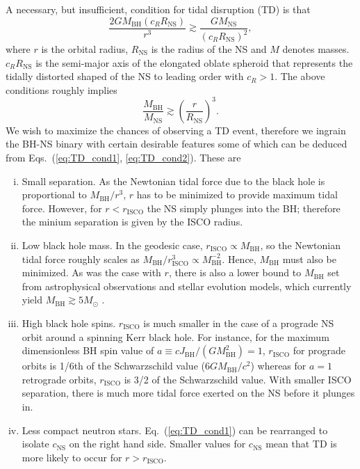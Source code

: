 \documentclass[prd,amsmath,amssymb,aps,floats,amsfonts,notitlepage,superscriptaddress,eqsecnum,nofootinbib,10pt]{revtex4-1}
\newcommand{\f}{\frac}
\newcommand{\be}{\begin{equation}}
\newcommand{\ee}{\end{equation}}
\begin{document}
A necessary, but insufficient, condition for tidal disruption (TD) is that
\be
\f{2 G M_\text{BH} (c_R R_\text{NS})}{r^3} \gtrsim \f{G M_\text{NS}}{(c_R R_\text{NS})^2} \label{eq:TD_cond1},
\ee
where $r$ is the orbital radius, $R_\text{NS}$ is the radius of the NS and $M$ denotes masses. 
$c_R R_\text{NS}$ is the semi-major axis of the elongated oblate spheroid that represents the tidally distorted shaped of the NS to leading order with
$c_R >1 $. %
The above conditions roughly implies
%
\be
\f{M_\text{BH}}{M_\text{NS}} \gtrsim \left(\f{r}{R_\text{NS}}\right)^3 \label{eq:TD_cond2}.
\ee
%
We wish to maximize the chances of observing a TD event, therefore we ingrain the BH-NS binary with certain desirable features
some of which can be deduced from Eqs.~(\ref{eq:TD_cond1}, \ref{eq:TD_cond2}). These are
%
%
\begin{enumerate}[(i)]
 \item Small separation. As the Newtonian tidal force due to the black hole is proportional to $M_\text{BH}/r^3$, $r$ has to be
 minimized to provide maximum tidal force. 
 However, for $r< r_\text{ISCO}$ the NS simply plunges into the BH; therefore the minium separation is given by the ISCO radius.
 \item Low black hole mass. In the geodesic case, $r_\text{ISCO} \propto M_\text{BH}$, so the Newtonian tidal force roughly scales as $M_\text{BH}/r_\text{ISCO}^3\propto M_\text{BH}^{-2}$. 
 Hence, $M_\text{BH}$ must also be minimized. 
 As was the case with $r$, there is also a lower bound to $M_\text{BH}$ set from astrophysical observations and stellar evolution models, which currently yield $M_\text{BH} \gtrsim 5 M_\odot$ \cite{Farr:2010tu, Raithel:2017nlc, Ozel:2010su, Wiktorowicz:2013dua, Christian:2018mjv}.
 \item High black hole spins. $r_\text{ISCO}$ is much smaller in the case of a prograde NS orbit around a spinning Kerr black hole.
 For instance, for the maximum dimensionless BH spin value of $a\equiv c J_\text{BH}/(G M^2_\text{BH})=1$, $r_\text{ISCO}$ for prograde orbits is 1/6th of the Schwarzschild value ($6GM_\text{BH}/c^2$) whereas for $a=1$ retrograde orbits, $r_\text{ISCO}$ is 3/2 of the Schwarzschild value.
 With smaller ISCO separation, there is much more tidal force exerted on the NS before it plunges in.
 \item Less compact neutron stars. Eq.~(\ref{eq:TD_cond1}) can be rearranged to isolate $c_\text{NS}$
 on the right hand side. Smaller values for $c_\text{NS}$ mean that TD is more likely to occur for $r>r_\text{ISCO}$.
\end{enumerate}
\end{document}
